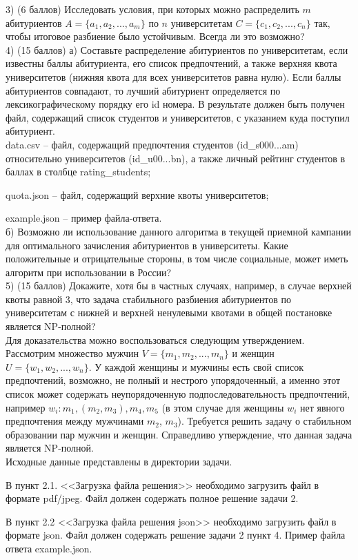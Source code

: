 \documentclass[a4paper, 12pt]{article}
\begin{document}
3) (6 баллов) Исследовать условия, при которых можно распределить $m$ абитуриентов $A=\{a_1, a_2, ..., a_m\}$ по $n$ университетам $C=\{c_1, c_2, ..., c_n\}$ так, чтобы итоговое разбиение было устойчивым.
Всегда ли это возможно?
\\

4) (15 баллов) а) Составьте распределение абитуриентов по университетам, если известны баллы абитуриента, его список предпочтений, а также верхняя квота университетов (нижняя квота для всех университетов равна нулю).
Если баллы абитуриентов совпадают, то лучший абитуриент определяется по лексикографическому порядку его id номера.
В результате должен быть получен файл, содержащий список студентов и университетов, с указанием куда поступил абитуриент.\\

data.csv -- файл, содержащий предпочтения студентов (id\_s000...am) относительно университетов (id\_u00...bn), а также личный рейтинг студентов в баллах в столбце rating\_students;

quota.json -- файл, содержащий верхние квоты университетов;

example.json -- пример файла-ответа.\\

б) Возможно ли использование данного алгоритма в текущей приемной кампании для оптимального зачисления абитуриентов в университеты.
Какие положительные и отрицательные стороны, в том числе социальные, может иметь алгоритм при использовании в России?
\\

5) (15 баллов) Докажите, хотя бы в частных случаях, например, в случае верхней квоты равной 3, что задача стабильного разбиения абитуриентов по университетам с нижней и верхней ненулевыми квотами в общей постановке является NP-полной?
\\

Для доказательства можно воспользоваться следующим утверждением.
Рассмотрим множество мужчин $V=\{m_1, m_2, ..., m_n\}$ и женщин $U=\{w_1, w_2, ..., w_n\}$.
У каждой женщины и мужчины есть свой список предпочтений, возможно, не полный и нестрого упорядоченный, а именно этот список может содержать неупорядоченную подпоследовательность предпочтений, например $w_i: m_1, (m_2,m_3), m_4, m_5$ (в этом случае для женщины $w_i$ нет явного предпочтения между мужчинами $m_2$, $m_3$).
Требуется решить задачу о стабильном образовании пар мужчин и женщин.
Справедливо утверждение, что данная задача является NP-полной.
\\

Исходные данные представлены в директории задачи.

В пункт 2.1. <<Загрузка файла решения>> необходимо загрузить файл в формате pdf/jpeg.
Файл должен содержать полное решение задачи 2.

В пункт 2.2 <<Загрузка файла решения json>> необходимо загрузить файл в формате json.
Файл должен содержать решение задачи 2 пункт 4.
Пример файла ответа example.json.
\end{document}
